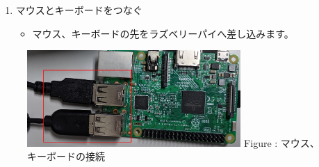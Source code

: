 \documentclass[a4paper,12pt]{jarticle}
\begin{document}
\begin{enumerate}
\begin{itemize}
        \end{itemize}
  \item マウスとキーボードをつなぐ

        \begin{itemize}
          \item
                マウス、キーボードの先をラズベリーパイへ差し込みます。
        \end{itemize}
\end{enumerate}

\begin{figure}[h]
  \begin{minipage}{8.135cm}
    {\upshape
      \includegraphics[width=8.135cm]{textbook-img017.png}
      \newline
      Figure :
      マウス、キーボードの接続}
  \end{minipage}
\end{figure}
\setcounter{saveenum}{\value{enumi}}
\end{document}
